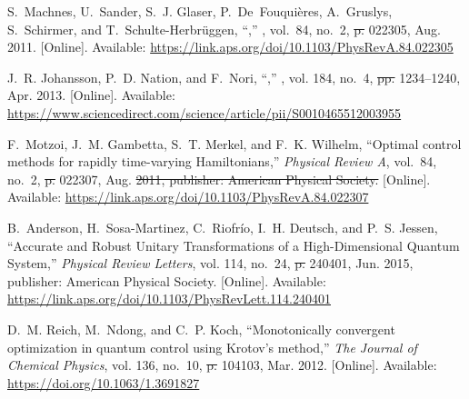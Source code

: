 \documentclass[a4paper,oneside,11pt]{book}
\providecommand{\DIFaddtex}[1]{{\protect\color{blue}\uwave{#1}}} %
\providecommand{\DIFdeltex}[1]{{\protect\color{red}\sout{#1}}}                      %
\providecommand{\DIFaddbegin}{} %
\providecommand{\DIFaddend}{} %
\providecommand{\DIFdelbegin}{} %
\providecommand{\DIFdelend}{} %
\providecommand{\DIFadd}[1]{\texorpdfstring{\DIFaddtex{#1}}{#1}} %
\providecommand{\DIFdel}[1]{\texorpdfstring{\DIFdeltex{#1}}{}} %
\newcommand{\DIFscaledelfig}{0.5}
\newlength{\DIFdelgraphicswidth} %
\newlength{\DIFdelgraphicsheight} %
\newcommand{\DIFaddincludegraphics}[2][]{{\color{blue}\fbox{\DIFOincludegraphics[#1]{#2}}}} %
\newcommand{\DIFdelincludegraphics}[2][]{%
\sbox{\DIFdelgraphicsbox}{\DIFOincludegraphics[#1]{#2}}%
\settoboxwidth{\DIFdelgraphicswidth}{\DIFdelgraphicsbox} %
\settoboxtotalheight{\DIFdelgraphicsheight}{\DIFdelgraphicsbox} %
\scalebox{\DIFscaledelfig}{%
\parbox[b]{\DIFdelgraphicswidth}{\usebox{\DIFdelgraphicsbox}\\[-\baselineskip] \rule{\DIFdelgraphicswidth}{0em}}\llap{\resizebox{\DIFdelgraphicswidth}{\DIFdelgraphicsheight}{%
\setlength{\unitlength}{\DIFdelgraphicswidth}%
\begin{picture}(1,1)%
\thicklines\linethickness{2pt} %
{\color[rgb]{1,0,0}\put(0,0){\framebox(1,1){}}}%
{\color[rgb]{1,0,0}\put(0,0){\line( 1,1){1}}}%
{\color[rgb]{1,0,0}\put(0,1){\line(1,-1){1}}}%
\end{picture}%
}\hspace*{3pt}}} %
} %
\DeclareRobustCommand{\DIFaddbegin}{\DIFOaddbegin \let\includegraphics\DIFaddincludegraphics} %
\DeclareRobustCommand{\DIFaddend}{\DIFOaddend \let\includegraphics\DIFOincludegraphics} %
\DeclareRobustCommand{\DIFdelbegin}{\DIFOdelbegin \let\includegraphics\DIFdelincludegraphics} %
\DeclareRobustCommand{\DIFdelend}{\DIFOaddend \let\includegraphics\DIFOincludegraphics} %
\begin{document}
\begin{thebibliography}{100}
\BIBentryALTinterwordspacing
S.~Machnes, U.~Sander, S.~J. Glaser, P.~De~Fouquières, A.~Gruslys,
  S.~Schirmer, and T.~Schulte-Herbrüggen, ``,'' \emph{},
  vol.~84, no.~2,  \DIFdelbegin \DIFdel{p. }\DIFdelend 022305, Aug. 2011. [Online]. Available:
  \url{https://link.aps.org/doi/10.1103/PhysRevA.84.022305}
\BIBentrySTDinterwordspacing

\BIBentryALTinterwordspacing
J.~R. Johansson, P.~D. Nation, and F.~Nori, ``,''
  \emph{}, vol. 184,
  no.~4,  \DIFdelbegin \DIFdel{pp. }\DIFdelend 1234--1240, Apr. 2013. [Online]. Available:
  \url{https://www.sciencedirect.com/science/article/pii/S0010465512003955}
\BIBentrySTDinterwordspacing

\BIBentryALTinterwordspacing
F.~Motzoi, J.~M. Gambetta, S.~T. Merkel, and F.~K. Wilhelm, ``Optimal control
  methods for rapidly time-varying {Hamiltonians},'' \emph{Physical Review A},
  vol.~84, no.~2,  \DIFdelbegin \DIFdel{p. }\DIFdelend 022307, Aug. \DIFdelbegin \DIFdel{2011, publisher: American Physical Society.
  }\DIFdelend \DIFaddbegin \DIFadd{2011. }\DIFaddend [Online]. Available:
  \url{https://link.aps.org/doi/10.1103/PhysRevA.84.022307}
\BIBentrySTDinterwordspacing

\BIBentryALTinterwordspacing
B.~Anderson, H.~Sosa-Martinez, C.~Riofrío, I.~H. Deutsch, and P.~S. Jessen,
  ``Accurate and {Robust} {Unitary} {Transformations} of a {High}-{Dimensional}
  {Quantum} {System},'' \emph{Physical Review Letters}, vol. 114, no.~24,
  \DIFdelbegin \DIFdel{p.
  }\DIFdelend 240401, Jun. 2015, publisher: American Physical Society. [Online]. Available:
  \url{https://link.aps.org/doi/10.1103/PhysRevLett.114.240401}
\BIBentrySTDinterwordspacing

\BIBentryALTinterwordspacing
D.~M. Reich, M.~Ndong, and C.~P. Koch, ``Monotonically convergent optimization
  in quantum control using {Krotov}'s method,'' \emph{The Journal of Chemical
  Physics}, vol. 136, no.~10,  \DIFdelbegin \DIFdel{p. }\DIFdelend 104103, Mar. 2012. [Online]. Available:
  \url{https://doi.org/10.1063/1.3691827}
\BIBentrySTDinterwordspacing


\end{thebibliography}
\end{document}
